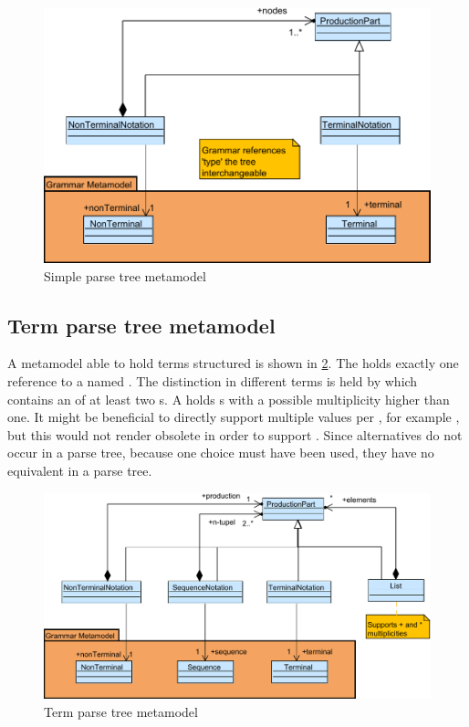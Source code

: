 \begin{figure}
\centering
\includegraphics[scale=0.75]{gfx/ex/Notation_ParseTree} 
\caption{Simple parse tree metamodel}
\label{MM:Not:PT}
\end{figure}

\subsection{Term parse tree metamodel}A metamodel able to hold terms structured is shown in \ref{MM:Not:TT}. The  holds exactly one reference to a  named . The distinction in different terms is held by  which contains an  of at least two s. A  holds s with a possible multiplicity higher than one. It might be beneficial to directly support multiple values per , for example , but this would not render  obsolete in order to support . Since alternatives do not occur in a parse tree, because one choice must have been used, they have no equivalent in a parse tree. 

\begin{figure}
\centering
\includegraphics[scale=0.75]{gfx/ex/Notation_TermTree} 
\caption{Term parse tree metamodel}
\label{MM:Not:TT}
\end{figure}

